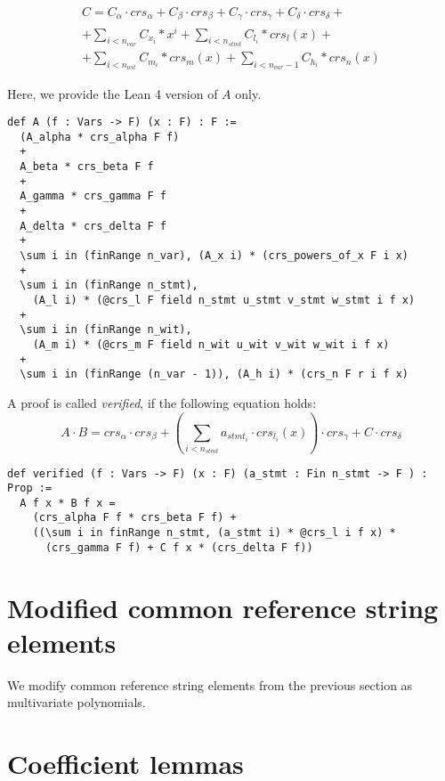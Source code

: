 \documentclass{article}
\theoremstyle{definition}
\theoremstyle{remark}
\begin{document}
\begin{multline}
C = C_{\alpha} \cdot crs_{\alpha} + C_{\beta} \cdot crs_{\beta} + C_{\gamma} \cdot crs_{\gamma} + C_{\delta} \cdot crs_{\delta} + \\
    + \sum \limits_{i < n_{var}} C_{x_i} * x^i + \sum \limits_{i < n_{stmt}} C_{l_i} * crs_l(x) + \\
    + \sum \limits_{i < n_{wit}} C_{m_i} * crs_m(x) + \sum \limits_{i < n_{var} - 1} C_{h_i} * crs_n(x)
\end{multline}

Here, we provide the Lean 4 version of $A$ only.

\begin{lstlisting}
def A (f : Vars -> F) (x : F) : F :=
  (A_alpha * crs_alpha F f)
  +
  A_beta * crs_beta F f
  +
  A_gamma * crs_gamma F f
  +
  A_delta * crs_delta F f
  +
  \sum i in (finRange n_var), (A_x i) * (crs_powers_of_x F i x)
  +
  \sum i in (finRange n_stmt),
    (A_l i) * (@crs_l F field n_stmt u_stmt v_stmt w_stmt i f x)
  +
  \sum i in (finRange n_wit),
    (A_m i) * (@crs_m F field n_wit u_wit v_wit w_wit i f x)
  +
  \sum i in (finRange (n_var - 1)), (A_h i) * (crs_n F r i f x)
\end{lstlisting}

A proof is called \emph{verified}, if the following equation holds:
\begin{equation}
A \cdot B = crs_{\alpha} \cdot crs_{\beta} + (\sum \limits_{i < n_{stmt}} a_{{stmt}_i} \cdot crs_{l_i}(x)) \cdot crs_{\gamma} + C \cdot crs_{\delta}
\end{equation}

\begin{lstlisting}
def verified (f : Vars -> F) (x : F) (a_stmt : Fin n_stmt -> F ) : Prop :=
  A f x * B f x =
    (crs_alpha F f * crs_beta F f) +
    ((\sum i in finRange n_stmt, (a_stmt i) * @crs_l i f x) *
      (crs_gamma F f) + C f x * (crs_delta F f))
\end{lstlisting}

\section{Modified common reference string elements}

We modify common reference string elements from the previous section as multivariate polynomials.

\section{Coefficient lemmas}
\end{document}
